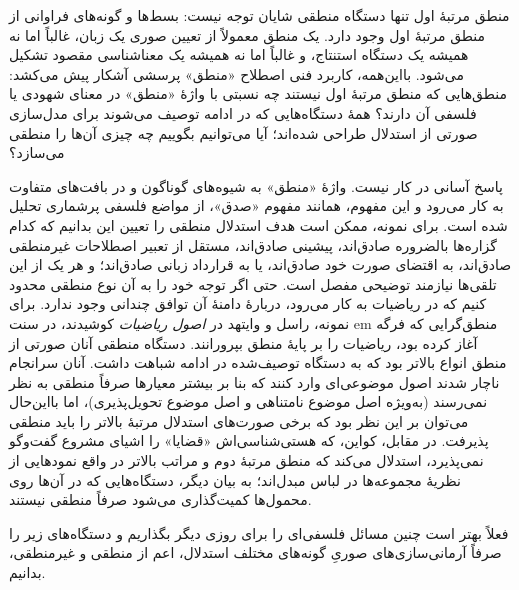 \documentclass[../../../include/open-logic-section]{subfiles}
\begin{document}


منطق مرتبهٔ اول تنها دستگاه منطقی شایان توجه نیست: بسط‌ها و گونه‌های
فراوانی از منطق مرتبهٔ اول وجود دارد. یک منطق معمولاً از تعیین صوری یک
زبان، غالباً اما نه همیشه یک دستگاه استنتاج، و غالباً اما نه همیشه یک
معناشناسی مقصود تشکیل می‌شود. بااین‌همه، کاربرد فنی اصطلاح «منطق»
پرسشی آشکار پیش می‌کشد: منطق‌هایی که منطق مرتبهٔ اول نیستند چه نسبتی
با واژهٔ «منطق» در معنای شهودی یا فلسفی آن دارند؟ همهٔ دستگاه‌هایی که
در ادامه توصیف می‌شوند برای مدل‌سازی صورتی از استدلال طراحی شده‌اند؛
آیا می‌توانیم بگوییم چه چیزی آن‌ها را منطقی می‌سازد؟

پاسخ آسانی در کار نیست. واژهٔ «منطق» به شیوه‌های گوناگون و در بافت‌های
متفاوت به کار می‌رود و این مفهوم، همانند مفهوم «صدق»، از مواضع فلسفی
پرشماری تحلیل شده است. برای نمونه، ممکن است هدف استدلال منطقی را تعیین
این بدانیم که کدام گزاره‌ها بالضروره صادق‌اند، پیشینی صادق‌اند، مستقل
از تعبیر اصطلاحات غیرمنطقی صادق‌اند، به اقتضای صورت خود صادق‌اند، یا
به قرارداد زبانی صادق‌اند؛ و هر یک از این تلقی‌ها نیازمند توضیحی مفصل
است. حتی اگر توجه خود را به آن نوع منطقی محدود کنیم که در ریاضیات به
کار می‌رود، دربارهٔ دامنهٔ آن توافق چندانی وجود ندارد. برای نمونه، راسل
و وایتهد در \textit{اصول ریاضیات} کوشیدند، در سنت {em منطق‌گرایی} که
فرگه آغاز کرده بود، ریاضیات را بر پایهٔ منطق بپرورانند. دستگاه منطقی
آنان صورتی از منطق انواع بالاتر بود که به دستگاه توصیف‌شده در ادامه
شباهت داشت. آنان سرانجام ناچار شدند اصول موضوعی‌ای وارد کنند که بنا بر
بیشتر معیارها صرفاً منطقی به نظر نمی‌رسند (به‌ویژه اصل موضوع نامتناهی و
اصل موضوع تحویل‌پذیری)، اما بااین‌حال می‌توان بر این نظر بود که برخی
صورت‌های استدلال مرتبهٔ بالاتر را باید منطقی پذیرفت. در مقابل، کواین،
که هستی‌شناسی‌اش «قضایا» را اشیای مشروع گفت‌وگو نمی‌پذیرد، استدلال
می‌کند که منطق مرتبهٔ دوم و مراتب بالاتر در واقع نمودهایی از نظریهٔ
مجموعه‌ها در لباس مبدل‌اند؛ به بیان دیگر، دستگاه‌هایی که در آن‌ها روی
محمول‌ها کمیت‌گذاری می‌شود صرفاً منطقی نیستند.

فعلاً بهتر است چنین مسائل فلسفی‌ای را برای روزی دیگر بگذاریم و
دستگاه‌های زیر را صرفاً آرمانی‌سازی‌های صوریِ گونه‌های مختلف استدلال،
اعم از منطقی و غیرمنطقی، بدانیم.
\end{document}
